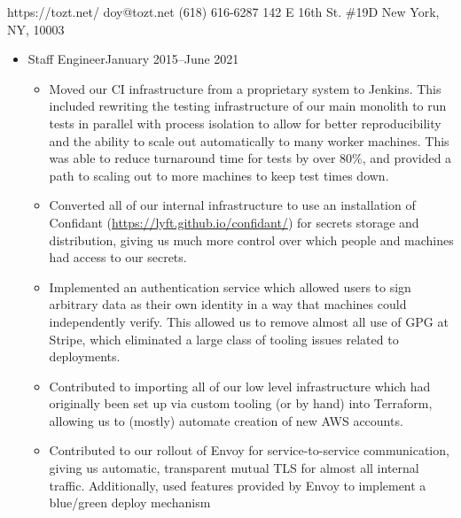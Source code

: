 \documentclass[letterpaper]{article}
\begin{document}
          {https://tozt.net/}
          {doy@tozt.net\hspace{0.5in}}
          {(618) 616-6287}
          {142 E 16th St. \#19D}
          {New York, NY, 10003}
\begin{itemize}
    \item {}
                        {Staff Engineer}{January 2015--June 2021}
        \begin{itemize}
            \item Moved our CI infrastructure from a proprietary system to
                Jenkins. This included rewriting the testing infrastructure of
                our main monolith to run tests in parallel with process
                isolation to allow for better reproducibility and the ability
                to scale out automatically to many worker machines. This was
                able to reduce turnaround time for tests by over 80\%, and
                provided a path to scaling out to more machines to keep test
                times down.
            \item Converted all of our internal infrastructure to use an
                installation of Confidant
                (\url{https://lyft.github.io/confidant/}) for secrets storage
                and distribution, giving us much more control over which people
                and machines had access to our secrets.
            \item Implemented an authentication service which allowed users to
                sign arbitrary data as their own identity in a way that
                machines could independently verify. This allowed us to remove
                almost all use of GPG at Stripe, which eliminated a large class
                of tooling issues related to deployments.
            \item Contributed to importing all of our low level infrastructure
                which had originally been set up via custom tooling (or by
                hand) into Terraform, allowing us to (mostly) automate creation
                of new AWS accounts.
            \item Contributed to our rollout of Envoy for service-to-service
                communication, giving us automatic, transparent mutual TLS for
                almost all internal traffic. Additionally, used features
                provided by Envoy to implement a blue/green deploy mechanism

\end{itemize}
\end{itemize}
\end{document}
